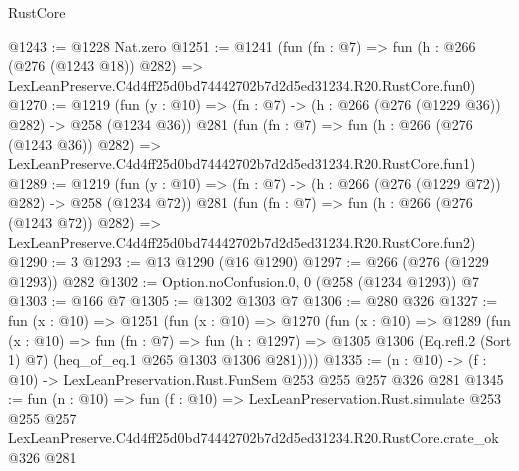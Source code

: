 \begin{lexlean}{RustCore}
\begin{coremodule}
@1243 := @1228 Nat.zero
@1251 := @1241
    (fun (fn : @7) =>
    fun (h : @266 (@276 (@1243 @18)) @282) =>
    LexLeanPreserve.C4d4ff25d0bd74442702b7d2d5ed31234.R20.RustCore.fun0)
@1270 := @1219
    (fun (y : @10) => (fn : @7) -> (h : @266 (@276 (@1229 @36)) @282) -> @258 (@1234 @36))
    @281
    (fun (fn : @7) =>
    fun (h : @266 (@276 (@1243 @36)) @282) =>
    LexLeanPreserve.C4d4ff25d0bd74442702b7d2d5ed31234.R20.RustCore.fun1)
@1289 := @1219
    (fun (y : @10) => (fn : @7) -> (h : @266 (@276 (@1229 @72)) @282) -> @258 (@1234 @72))
    @281
    (fun (fn : @7) =>
    fun (h : @266 (@276 (@1243 @72)) @282) =>
    LexLeanPreserve.C4d4ff25d0bd74442702b7d2d5ed31234.R20.RustCore.fun2)
@1290 := 3
@1293 := @13 @1290 (@16 @1290)
@1297 := @266 (@276 (@1229 @1293)) @282
@1302 := Option.noConfusion.{0, 0} (@258 (@1234 @1293)) @7
@1303 := @166 @7
@1305 := @1302 @1303 @7
@1306 := @280 @326
@1327 := fun (x : @10) =>
  @1251
    (fun (x : @10) =>
    @1270
      (fun (x : @10) =>
      @1289
        (fun (x : @10) =>
        fun (fn : @7) =>
        fun (h : @1297) =>
        @1305 @1306 (Eq.refl.{2} (Sort 1) @7) (heq_of_eq.{1} @265 @1303 @1306 @281))))
@1335 := (n : @10) -> (f : @10) -> LexLeanPreservation.Rust.FunSem @253 @255 @257 @326 @281
@1345 := fun (n : @10) =>
  fun (f : @10) =>
  LexLeanPreservation.Rust.simulate
    @253
    @255
    @257
    LexLeanPreserve.C4d4ff25d0bd74442702b7d2d5ed31234.R20.RustCore.crate_ok
    @326
    @281
\end{coremodule}
\end{lexlean}
